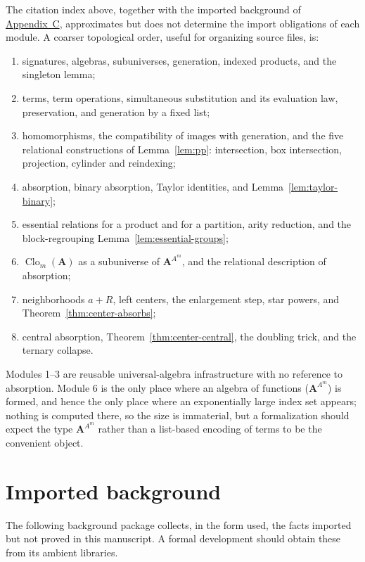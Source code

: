 \documentclass[11pt]{article}
\theoremstyle{mainplain}
\theoremstyle{mainroman}
\theoremstyle{definition}
\providecommand{\tightlist}{\setlength{\itemsep}{0pt}\setlength{\parskip}{0pt}}
\numberwithin{equation}{section}
\DeclareMathOperator{\Clo}{Clo}
\newcommand{\bA}{\mathbf A}
\begin{document}
The citation index above, together with the imported background of
\hyperref[app:background]{Appendix~C}, approximates but does not determine the
import obligations of each module. A coarser topological order, useful for
organizing source files, is:
\begin{enumerate}\tightlist
\item signatures, algebras, subuniverses, generation, indexed products, and the
      singleton lemma;
\item terms, term operations, simultaneous substitution and its evaluation law,
      preservation, and generation by a fixed list;
\item homomorphisms, the compatibility of images with generation, and the five
      relational constructions of Lemma~\ref{lem:pp}: intersection, box
      intersection, projection, cylinder and reindexing;
\item absorption, binary absorption, Taylor identities, and
      Lemma~\ref{lem:taylor-binary};
\item essential relations for a product and for a partition, arity reduction,
      and the block-regrouping Lemma~\ref{lem:essential-groups};
\item $\Clo_m(\bA)$ as a subuniverse of $\bA^{A^m}$, and the relational
      description of absorption;
\item neighborhoods $a+R$, left centers, the enlargement step, star powers, and
      Theorem~\ref{thm:center-absorbs};
\item central absorption, Theorem~\ref{thm:center-central}, the doubling trick,
      and the ternary collapse.
\end{enumerate}

Modules 1--3 are reusable universal-algebra infrastructure with no reference to
absorption. Module 6 is the only place where an algebra of functions
($\bA^{A^m}$) is formed, and hence the only place where an exponentially large
index set appears; nothing is computed there, so the size is immaterial, but a
formalization should expect the type $\bA^{A^m}$ rather than a list-based
encoding of terms to be the convenient object.

\section{Imported background}\label{app:background}

The following background package collects, in the form used, the facts imported
but not proved in this manuscript. A formal development should obtain these
from its ambient libraries.
\end{document}
